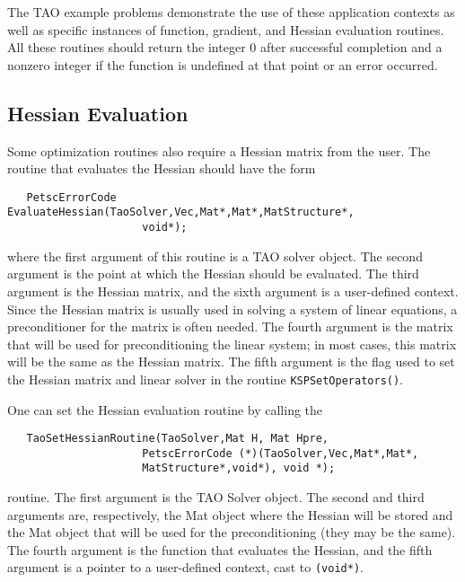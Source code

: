 The TAO example problems demonstrate the use of these application contexts
as well as specific instances of function, gradient, and Hessian 
evaluation routines.
All these routines should return the integer $0$ after 
successful completion and a nonzero integer if the function
is undefined at that point or an error occurred.

\subsection{Hessian Evaluation}
\label{sec:matrixfree}
\label{sec:finitedifference}

Some optimization routines also require a Hessian matrix from the user.
The routine that evaluates the Hessian should have the form 
\begin{verbatim}
   PetscErrorCode EvaluateHessian(TaoSolver,Vec,Mat*,Mat*,MatStructure*,
                     void*);
\end{verbatim}
where the first argument of this routine is a TAO solver object.  The
second
argument is the point at which the Hessian should be evaluated.  The
third argument is the Hessian matrix, and the sixth argument is a
user-defined context.
Since the Hessian matrix is usually used in solving
a system of linear equations, a preconditioner for the matrix is often
needed.  The fourth argument is the matrix that will be used
for preconditioning the linear system; in most cases, this
matrix will be the same as the Hessian matrix.  The fifth
argument is the flag used to set the Hessian matrix and
linear solver in the routine {\tt KSPSetOperators()}.

One can set the Hessian evaluation routine by calling the 
\begin{verbatim}
   TaoSetHessianRoutine(TaoSolver,Mat H, Mat Hpre,
                     PetscErrorCode (*)(TaoSolver,Vec,Mat*,Mat*,
                     MatStructure*,void*), void *);
\end{verbatim}
routine. 
The first argument is the TAO Solver object. The second and third arguments
are, respectively, the Mat object where the Hessian will be stored and 
the Mat object
that will be used for the preconditioning (they may be the same). The fourth 
argument is the function that evaluates the Hessian, 
and the fifth argument is a pointer to a user-defined context,
cast to {\tt (void*)}.

